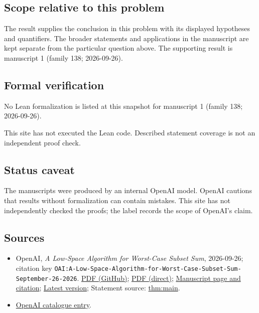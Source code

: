 \documentclass[11pt]{article}
\begin{document}
\subsection{Scope relative to this problem}
The result supplies the conclusion in this problem with its displayed hypotheses and quantifiers. The broader statements and applications in the manuscript are kept separate from the particular question above. The supporting result is manuscript 1 (family 138; 2026-09-26).

\subsection{Formal verification}
No Lean formalization is listed at this snapshot for manuscript 1 (family 138; 2026-09-26).

This site has not executed the Lean code. Described statement coverage is not an independent proof check.

\subsection{Status caveat}
The manuscripts were produced by an internal OpenAI model. OpenAI cautions that results without formalization can contain mistakes. This site has not independently checked the proofs; the label records the scope of OpenAI's claim.

\subsection{Sources}
\begin{itemize}
\item OpenAI, \emph{A Low-Space Algorithm for Worst-Case Subset Sum}, 2026-09-26; citation key \texttt{OAI:A-Low-Space-Algorithm-for-Worst-Case-Subset-Sum-September-26-2026}. \href{https://github.com/openai/math/blob/adc7f1241b42e322a6451854ab7e4b4c146bf78a/preprints/A-Low-Space-Algorithm-for-Worst-Case-Subset-Sum-September-26-2026/paper.pdf}{PDF (GitHub)}; \href{https://github.com/openai/math/raw/adc7f1241b42e322a6451854ab7e4b4c146bf78a/preprints/A-Low-Space-Algorithm-for-Worst-Case-Subset-Sum-September-26-2026/paper.pdf}{PDF (direct)}; \href{https://github.com/openai/math/blob/adc7f1241b42e322a6451854ab7e4b4c146bf78a/preprints/A-Low-Space-Algorithm-for-Worst-Case-Subset-Sum-September-26-2026/README.md}{Manuscript page and citation}; \href{https://github.com/openai/math/blob/main/preprints/A-Low-Space-Algorithm-for-Worst-Case-Subset-Sum-September-26-2026/paper.pdf}{Latest version}; Statement source: \href{https://github.com/openai/math/blob/adc7f1241b42e322a6451854ab7e4b4c146bf78a/preprints/A-Low-Space-Algorithm-for-Worst-Case-Subset-Sum-September-26-2026/build/introduction.tex\#L70}{thm:main}.
\item \href{https://github.com/openai/math/blob/adc7f1241b42e322a6451854ab7e4b4c146bf78a/CONTENTS.md}{OpenAI catalogue entry}.
\end{itemize}
\end{document}
